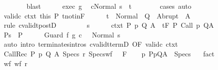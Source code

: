 \begin{isabellebody}
\ \ \ \ \ \ \isamarkupfalse%
\ blast\isanewline
\ \ \ \ \isamarkupfalse%
\ exec\ g\ \isamarkupfalse%
\ {\isachardoublequoteopen}{\isasymGamma}{\isasymturnstile}{\isasymlangle}c{\isacharcomma}Normal\ s{\isasymrangle}\ {\isasymRightarrow}\ t{\isachardoublequoteclose}\isanewline
\ \ \ \ \ \ \isamarkupfalse%
\ cases\ auto\isanewline
\ \ \ \ \isamarkupfalse%
\ valid{\isacharunderscore}c\ ctxt\ this\ P{\isacharprime}\ t{\isacharunderscore}notin{\isacharunderscore}F\isanewline
\ \ \ \ \isamarkupfalse%
\ {\isachardoublequoteopen}t\ {\isasymin}\ Normal\ {\isacharbackquote}\ Q\ {\isasymunion}\ Abrupt\ {\isacharbackquote}\ A{\isachardoublequoteclose}\isanewline
\ \ \ \ \ \ \isamarkupfalse%
\ {\isacharparenleft}rule\ cvalidt{\isacharunderscore}postD{\isacharparenright}\isanewline
\ \ \isamarkupfalse%
\isanewline
\ \ \ \ \isamarkupfalse%
\ s\isanewline
\ \ \ \ \isamarkupfalse%
\ ctxt{\isacharcolon}\ {\isachardoublequoteopen}{\isasymforall}{\isacharparenleft}P{\isacharcomma}\ p{\isacharcomma}\ Q{\isacharcomma}\ A{\isacharparenright}{\isasymin}{\isasymTheta}{\isachardot}\ {\isasymGamma}\ {\isasymTurnstile}\isactrlsub t\isactrlbsub {\isacharslash}F\isactrlesub \ P\ {\isacharparenleft}Call\ p{\isacharparenright}\ Q{\isacharcomma}A{\isachardoublequoteclose}\isanewline
\ \ \ \ \isamarkupfalse%
\ P{\isacharcolon}{\isachardoublequoteopen}s\ {\isasymin}\ P{\isachardoublequoteclose}\isanewline
\ \ \ \ \isamarkupfalse%
\ {\isachardoublequoteopen}{\isasymGamma}{\isasymturnstile}Guard\ f\ g\ c\ \ {\isasymdown}\ Normal\ s{\isachardoublequoteclose}\isanewline
\ \ \ \ \ \ \isamarkupfalse%
\ {\isacharparenleft}auto\ intro{\isacharcolon}\ terminates{\isachardot}intros\ cvalidt{\isacharunderscore}termD\ {\isacharbrackleft}OF\ valid{\isacharunderscore}c\ ctxt{\isacharbrackright}{\isacharparenright}\isanewline
\ \ \isamarkupfalse%
\isanewline
{}\isamarkupfalse%
\isanewline
\ \ \isamarkupfalse%
\ {\isacharparenleft}CallRec\ P\ p\ Q\ A\ Specs\ r\ Specs{\isacharunderscore}wf\ {\isasymTheta}\ \ F{\isacharparenright}\isanewline
\ \ \isamarkupfalse%
\ p{\isacharcolon}\ {\isachardoublequoteopen}{\isacharparenleft}P{\isacharcomma}p{\isacharcomma}Q{\isacharcomma}A{\isacharparenright}\ {\isasymin}\ Specs{\isachardoublequoteclose}\ \ \isamarkupfalse%
\ fact\isanewline
\ \ \isamarkupfalse%
\ wf{\isacharcolon}\ {\isachardoublequoteopen}wf\ r{\isachardoublequoteclose}\ \isamarkupfalse%

\end{isabellebody}
